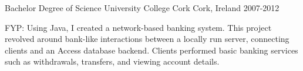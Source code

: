 


\begin{cventries}


\cventry
{Bachelor Degree of Science} %
{University College Cork} %
{Cork, Ireland} %
{2007-2012} %
{ %
\begin{cvitems}
\item {FYP: Using Java, I created a network-based banking system. This project revolved around bank-like interactions between a locally run server, connecting clients and an Access database backend. Clients performed basic banking services such as withdrawals, transfers, and viewing account details.}
\end{cvitems}
}


\end{cventries}
